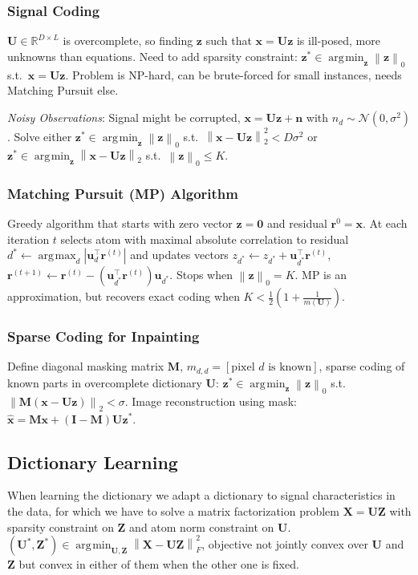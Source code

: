\documentclass[11pt,a4paper,technote]{IEEEtran}
\DeclareMathOperator*{\argmin}{\arg\!\min}
\DeclareMathOperator*{\argmax}{\arg\!\max}
\newcommand{\iver}[1]{\left[#1\right]}
\newcommand{\abs}[1]{\left\lvert#1\right\rvert}
\newcommand{\norm}[1]{\left\lVert#1\right\rVert}
\newcommand{\matr}[1]{\boldsymbol{\mathbf{#1}}}
\newcommand{\vect}[1]{\boldsymbol{\mathbf{#1}}}
\newcommand{\trns}[1]{#1^{\top}}
\newcommand{\normal}{\mathcal{N}}
\newcommand{\R}{\mathbb{R}}
\begin{document}
\subsubsection*{Signal Coding}
$\matr{U}\in\R^{D \times L}$ is overcomplete, so finding $\vect{z}$ such that
$\vect{x} = \matr{U}\vect{z}$ is ill-posed, more unknowns than equations. Need
to add sparsity constraint: $\vect{z}^*\in\argmin_{\vect{z}} \norm{\vect{z}}_0$
s.t.\ $\vect{x} = \matr{U}\vect{z}$. Problem is NP-hard, can be brute-forced for
small instances, needs Matching Pursuit else.

\emph{Noisy Observations}: Signal might be corrupted, $\vect{x} = \matr{U}
\vect{z} + \vect{n}$ with $n_d \sim \normal(0,\sigma^2)$. Solve either
$\vect{z}^* \in \argmin_{\vect{z}}\norm{\vect{z}}_0$ s.t.\ $\norm{\vect{x} -
  \matr{U}\vect{z}}_2^2 < D\sigma^2$ or $\vect{z}^* \in \argmin_{\vect{z}}
\norm{\vect{x} - \matr{U} \vect{z}}_2$ s.t.\ $\norm{\vect{z}}_0 \leq K$.

\subsubsection*{Matching Pursuit (MP) Algorithm} Greedy algorithm that starts
with zero vector $\vect{z} = \vect{0}$ and residual $\vect{r}^0 = \vect{x}$. At
each iteration $t$ selects atom with maximal absolute correlation to residual
$d^* \gets \argmax_d \abs{\trns{\vect{u}_d} \vect{r}^{(t)}}$ and updates
vectors $z_{d^*} \gets z_{d^*} + \trns{\vect{u}_{d^*}} \vect{r}^{(t)}$,
$\vect{r}^{(t+1)} \gets \vect{r}^{(t)} - (\trns{\vect{u}_{d^*}} \vect{r}^{(t)})
\vect{u}_{d^*}$. Stops when $\norm{\vect{z}}_0 = K$. MP is an approximation,
but recovers exact coding when $K < \frac{1}{2}(1 + \frac{1}{m(\matr{U})})$.

\subsubsection*{Sparse Coding for Inpainting}
Define diagonal masking matrix $\matr{M}$, $m_{d,d} = \iver{\text{pixel $d$ is
    known}}$, sparse coding of known parts in overcomplete dictionary
$\matr{U}$: $\vect{z}^* \in \argmin_{\vect{z}} \norm{\vect{z}}_0$ s.t.\
$\norm{\matr{M}(\vect{x} - \matr{U}\vect{z})}_2 < \sigma$. Image reconstruction
using mask: $\hat{\vect{x}} = \matr{M}\vect{x} + (\matr{I} - \matr{M})
\matr{U}\vect{z}^*$.

\subsection*{Dictionary Learning}
When learning the dictionary we adapt a dictionary to signal
characteristics in the data, for which we have to solve a matrix
factorization problem $\matr{X} = \matr{U}\matr{Z}$ with sparsity
constraint on $\matr{Z}$ and atom norm constraint on $\matr{U}$.
$(\matr{U}^*, \matr{Z}^*) \in \argmin_{\matr{U},\matr{Z}} \norm{\matr{X} -
  \matr{U}\matr{Z}}_F^2$, objective not jointly convex over $\matr{U}$ and
$\matr{Z}$ but convex in either of them when the other one is fixed.
\end{document}
